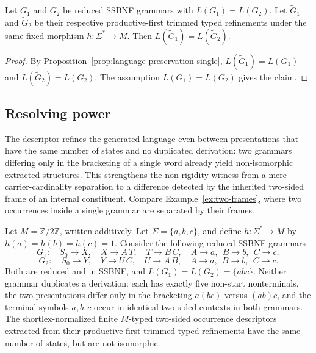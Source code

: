 \documentclass[sub]{jalc}
\begin{document}
\begin{corollary}
\label{prop:language-equivalence-preserved}
Let \(G_1\) and \(G_2\) be reduced SSBNF grammars with \(L(G_1)=L(G_2)\). Let \(\widetilde G_1\) and \(\widetilde G_2\) be their respective productive-first trimmed typed refinements under the same fixed morphism \(h:\Sigma^*\to M\). Then \(L(\widetilde G_1)=L(\widetilde G_2)\).
\end{corollary}

\begin{proof}
By Proposition~\ref{prop:language-preservation-single}, \(L(\widetilde G_1)=L(G_1)\) and \(L(\widetilde G_2)=L(G_2)\). The assumption \(L(G_1)=L(G_2)\) gives the claim.
\end{proof}


\subsection{Resolving power}
\label{subsec:resolving-power}

The descriptor refines the generated language even between presentations that have the same number of states and no duplicated derivation: two grammars differing only in the bracketing of a single word already yield non-isomorphic extracted structures. This strengthens the non-rigidity witness from a mere carrier-cardinality separation to a difference detected by the inherited two-sided frame of an internal constituent. Compare Example~\ref{ex:two-frames}, where two occurrences inside a single grammar are separated by their frames.

\begin{proposition}
\label{prop:bracketing-nonrigidity}
Let \(M=\mathbb Z/2\mathbb Z\), written additively. Let \(\Sigma=\{a,b,c\}\), and define \(h:\Sigma^*\to M\) by \(h(a)=h(b)=h(c)=1\). Consider the following reduced SSBNF grammars
\[
  G_1:\quad S_0\to X,\quad X\to A\,T,\quad T\to B\,C,\quad
  A\to a,\ \ B\to b,\ \ C\to c,
\]
\[
  G_2:\quad S_0\to Y,\quad Y\to U\,C,\quad U\to A\,B,\quad
  A\to a,\ \ B\to b,\ \ C\to c.
\]
Both are reduced and in SSBNF, and \(L(G_1)=L(G_2)=\{abc\}\). Neither grammar duplicates a derivation: each has exactly five non-start nonterminals, the two presentations differ only in the bracketing \(a(bc)\) versus \((ab)c\), and the terminal symbols \(a,b,c\) occur in identical two-sided contexts in both grammars. The shortlex-normalized finite \(M\)-typed two-sided occurrence descriptors extracted from their productive-first trimmed typed refinements have the same number of states, but are not isomorphic.
\end{proposition}
\end{document}
